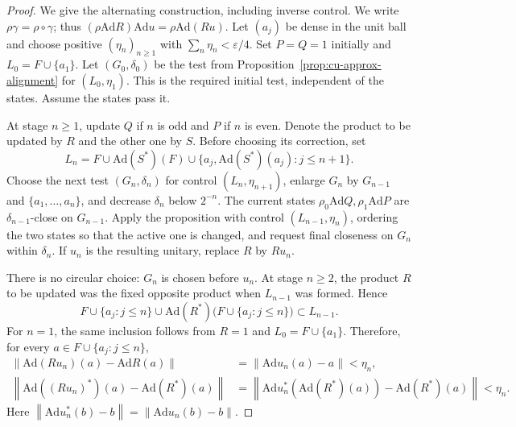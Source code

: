 \begin{proof}
We give the alternating construction, including inverse control. We write $\rho\gamma=\rho\circ\gamma$; thus $(\rho\mathrm{Ad} R)\mathrm{Ad} u=\rho \mathrm{Ad}(Ru)$. Let $(a_j)$ be dense in the unit ball and choose positive $(\eta_n)_{n\geq1}$ with $\sum_n\eta_n<\varepsilon/4$. Set $P=Q=1$ initially
and $L_0=F\cup\{a_1\}$. Let $(G_0,\delta_0)$ be the test from Proposition~\ref{prop:cu-approx-alignment} for $(L_0,\eta_1)$. This is the required initial
test, independent of the states. Assume the states pass it.

At stage $n\geq1$, update $Q$ if $n$ is odd and $P$ if $n$ is even. Denote
the product to be updated by $R$ and the other one by $S$. Before choosing
its correction, set 
\begin{equation*}
L_n=F\cup\mathrm{Ad}(S^*)(F)\cup \{a_j,\mathrm{Ad}(S^*)(a_j):j\leq n+1\}.
\end{equation*}
Choose the next test $(G_n,\delta_n)$ for control $(L_n,\eta_{n+1})$,
enlarge $G_n$ by $G_{n-1}$ and $\{a_1,\ldots,a_n\}$, and decrease $\delta_n$
below $2^{-n}$. The current states $\rho_0\mathrm{Ad} Q,\rho_1\mathrm{Ad} P$
are $\delta_{n-1}$-close on $G_{n-1}$. Apply the proposition with control $(L_{n-1},\eta_n)$, ordering the two states so that the active one is
changed, and request final closeness on $G_n$ within $\delta_n$. If $u_n$ is
the resulting unitary, replace $R$ by $Ru_n$.

There is no circular choice: $G_n$ is chosen before $u_n$. At stage $n\geq2$, the product $R$ to be updated was the fixed opposite product when $L_{n-1}$
was formed. Hence 
\begin{equation*}
F\cup\{a_j:j\leq n\}\cup \mathrm{Ad}(R^*)\bigl(F\cup\{a_j:j\leq n\}\bigr)\subset L_{n-1}.
\end{equation*}
For $n=1$, the same inclusion follows from $R=1$ and $L_0=F\cup\{a_1\}$.
Therefore, for every $a\in F\cup\{a_j:j\leq n\}$, 
\begin{equation*}
\begin{split}
\left\|\mathrm{Ad}(Ru_n)(a)-\mathrm{Ad} R(a)\right\| &=\left\|\mathrm{Ad}
u_n(a)-a\right\|<\eta_n, \\
\left\|\mathrm{Ad}((Ru_n)^*)(a)-\mathrm{Ad}(R^*)(a)\right\| &=\left\|\mathrm{Ad} u_n^*(\mathrm{Ad}(R^*)(a))-\mathrm{Ad}(R^*)(a)\right\|<\eta_n.
\end{split}\end{equation*}
Here $\left\|\mathrm{Ad} u_n^*(b)-b\right\|=\left\|\mathrm{Ad}
u_n(b)-b\right\|$.


\end{proof}
